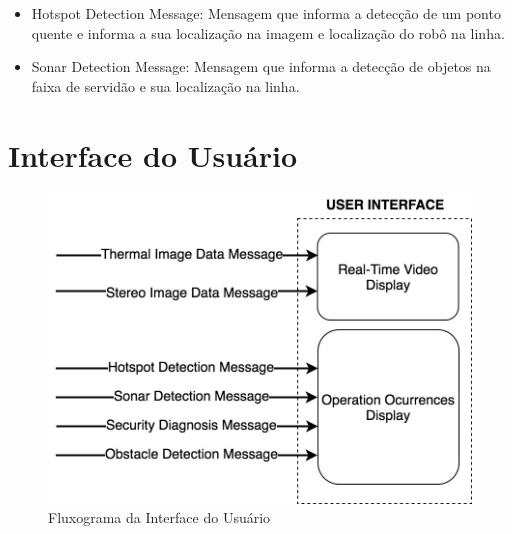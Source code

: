     \begin{itemize}
        	\item Hotspot Detection Message: Mensagem que informa a detecção de um ponto quente e informa a sua localização na imagem e localização do robô na linha.
            \item Sonar Detection Message: Mensagem que informa a detecção de objetos na faixa de servidão e sua localização na linha.
    \end{itemize}
    \pagebreak

\section{Interface do Usuário}
\label{sec:ui}
    \begin{figure}[!ht]
	\centering
	\includegraphics[width=16cm]{Figures/Fluxograma_Interface.jpg}
	\caption{Fluxograma da Interface do Usuário} \label{UI}
	\end{figure}
	


\pagebreak
\newpage


